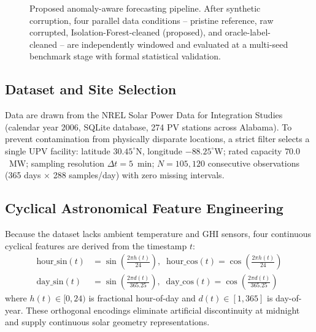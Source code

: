 \documentclass[conference]{IEEEtran}
\begin{document}
\begin{figure}[!t]
{%
}
\caption{Proposed anomaly-aware forecasting pipeline. After synthetic corruption, four parallel data conditions -- pristine reference, raw corrupted, Isolation-Forest-cleaned (proposed), and oracle-label-cleaned -- are independently windowed and evaluated at a multi-seed benchmark stage with formal statistical validation.}
\label{fig:architecture}
\end{figure}

\subsection{Dataset and Site Selection}
Data are drawn from the NREL Solar Power Data for Integration Studies (calendar year 2006, SQLite database, 274 PV stations across Alabama). To prevent contamination from physically disparate locations, a strict filter selects a single UPV facility: latitude $30.45^\circ$N, longitude $-88.25^\circ$W; rated capacity $70.0$~MW; sampling resolution $\Delta t = 5$~min; $N = 105{,}120$ consecutive observations (365 days $\times$ 288 samples/day) with zero missing intervals.

\subsection{Cyclical Astronomical Feature Engineering}
Because the dataset lacks ambient temperature and GHI sensors, four continuous cyclical features are derived from the timestamp $t$:
\begin{align}
\text{hour\_sin}(t) &= \sin\!\left(\frac{2\pi h(t)}{24}\right), \;\;
\text{hour\_cos}(t) = \cos\!\left(\frac{2\pi h(t)}{24}\right) \\
\text{day\_sin}(t) &= \sin\!\left(\frac{2\pi d(t)}{365.25}\right), \;\;
\text{day\_cos}(t) = \cos\!\left(\frac{2\pi d(t)}{365.25}\right)
\end{align}
where $h(t) \in [0, 24)$ is fractional hour-of-day and $d(t) \in [1, 365]$ is day-of-year. These orthogonal encodings eliminate artificial discontinuity at midnight and supply continuous solar geometry representations.
\end{document}
